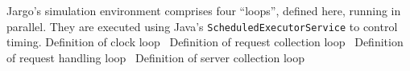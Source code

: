  Jargo's simulation environment comprises four ``loops'', defined
here, running in parallel. They are executed using Java's
{\tt{}ScheduledExecutorService} to control timing.
\nwenddocs{}\endmoddef{}
\LA{}Definition of clock loop~{\nwtagstyle{}}\RA{}
\LA{}Definition of request collection loop~{\nwtagstyle{}}\RA{}
\LA{}Definition of request handling loop~{\nwtagstyle{}}\RA{}
\LA{}Definition of server collection loop~{\nwtagstyle{}}\RA{}
\nwendcode{}\nwdocspar


